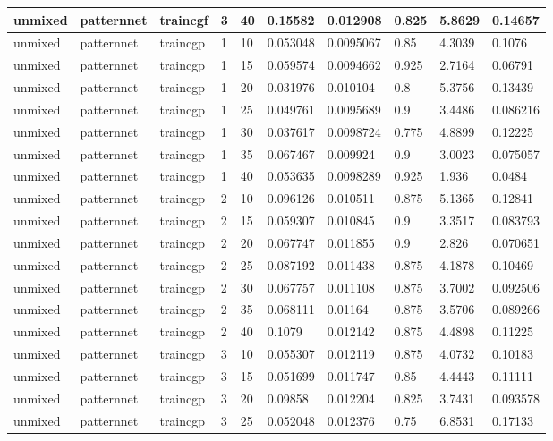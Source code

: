\begin{longtable}{lllllllll}
unmixed & patternnet & traincgf & 3 & 40 & 0.15582 & 0.012908 & 0.825 & 5.8629 & 0.14657 \\ \hline 
unmixed & patternnet & traincgp & 1 & 10 & 0.053048 & 0.0095067 & 0.85 & 4.3039 & 0.1076 \\ \hline 
unmixed & patternnet & traincgp & 1 & 15 & 0.059574 & 0.0094662 & 0.925 & 2.7164 & 0.06791 \\ \hline 
unmixed & patternnet & traincgp & 1 & 20 & 0.031976 & 0.010104 & 0.8 & 5.3756 & 0.13439 \\ \hline 
unmixed & patternnet & traincgp & 1 & 25 & 0.049761 & 0.0095689 & 0.9 & 3.4486 & 0.086216 \\ \hline 
unmixed & patternnet & traincgp & 1 & 30 & 0.037617 & 0.0098724 & 0.775 & 4.8899 & 0.12225 \\ \hline 
unmixed & patternnet & traincgp & 1 & 35 & 0.067467 & 0.009924 & 0.9 & 3.0023 & 0.075057 \\ \hline 
unmixed & patternnet & traincgp & 1 & 40 & 0.053635 & 0.0098289 & 0.925 & 1.936 & 0.0484 \\ \hline 
unmixed & patternnet & traincgp & 2 & 10 & 0.096126 & 0.010511 & 0.875 & 5.1365 & 0.12841 \\ \hline 
unmixed & patternnet & traincgp & 2 & 15 & 0.059307 & 0.010845 & 0.9 & 3.3517 & 0.083793 \\ \hline 
unmixed & patternnet & traincgp & 2 & 20 & 0.067747 & 0.011855 & 0.9 & 2.826 & 0.070651 \\ \hline 
unmixed & patternnet & traincgp & 2 & 25 & 0.087192 & 0.011438 & 0.875 & 4.1878 & 0.10469 \\ \hline 
unmixed & patternnet & traincgp & 2 & 30 & 0.067757 & 0.011108 & 0.875 & 3.7002 & 0.092506 \\ \hline 
unmixed & patternnet & traincgp & 2 & 35 & 0.068111 & 0.01164 & 0.875 & 3.5706 & 0.089266 \\ \hline 
unmixed & patternnet & traincgp & 2 & 40 & 0.1079 & 0.012142 & 0.875 & 4.4898 & 0.11225 \\ \hline 
unmixed & patternnet & traincgp & 3 & 10 & 0.055307 & 0.012119 & 0.875 & 4.0732 & 0.10183 \\ \hline 
unmixed & patternnet & traincgp & 3 & 15 & 0.051699 & 0.011747 & 0.85 & 4.4443 & 0.11111 \\ \hline 
unmixed & patternnet & traincgp & 3 & 20 & 0.09858 & 0.012204 & 0.825 & 3.7431 & 0.093578 \\ \hline 
unmixed & patternnet & traincgp & 3 & 25 & 0.052048 & 0.012376 & 0.75 & 6.8531 & 0.17133 \\ \hline 

\end{longtable}
